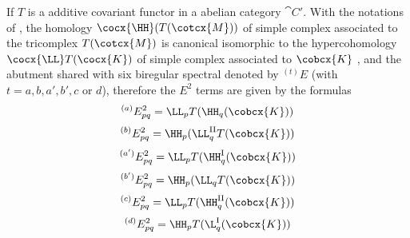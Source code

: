 \begin{proposition}[11.7.2]
If $T$ is a additive covariant functor in a abelian category $\cat{C'}$. 
With the notations of , the homology $\cocx{\HH}(T(\cotcx{M}))$ of simple complex associated to the tricomplex $T(\cotcx{M})$ is canonical isomorphic to 
the hypercohomology $\cocx{\LL} T(\cocx{K})$ of simple complex associated to $\cobcx{K}$ , and the abutment shared with six biregular spectral denoted by 
$^{(t)}E$ (with $t=a,b,a',b',c$ or $d$), therefore the $E^2$ terms are given by the formulas 
\[
  ^{(a)}E_{pq}^2 = \LL_p T(\HH_q(\cobcx{K}))
\]
\[
  ^{(b)}E_{pq}^2 = \HH_p (\LL_q^\text{II}T(\cobcx{K}))
\]
\[
  ^{(a')}E_{pq}^2 = \LL_p T(\HH_q^\text{I}(\cobcx{K}))
\]
\[
  ^{(b')}E_{pq}^2 = \HH_p (\LL_q T(\cobcx{K}))
\]
\[
  ^{(c)}E_{pq}^2 = \LL_p T(\HH_q^\text{II}(\cobcx{K}))
\]
\[
  ^{(d)}E_{pq}^2 = \HH_p T(\L_q^\text{I}(\cobcx{K}))
\]
\end{proposition}
